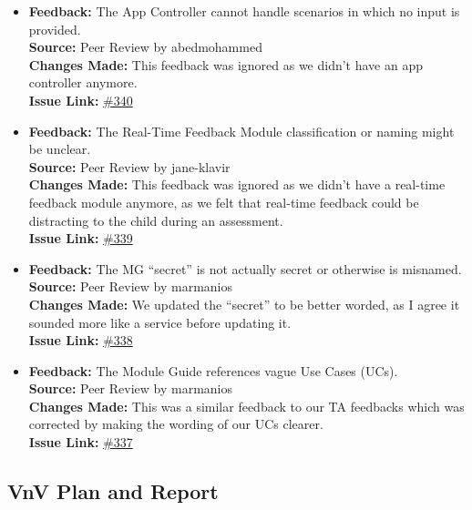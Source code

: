 \documentclass{article}
\begin{document}
\begin{itemize}
    \item 
        \textbf{Feedback:} The App Controller cannot handle scenarios in which no input is provided.\\
        \textbf{Source:} Peer Review by abedmohammed\\
        \textbf{Changes Made:} This feedback was ignored as we didn’t have an app controller anymore.\\
        \textbf{Issue Link:} \href{https://github.com/parishanizam/TeleHealth/issues/340}{\#340}
  
    \item 
        \textbf{Feedback:} The Real-Time Feedback Module classification or naming might be unclear.\\
        \textbf{Source:} Peer Review by jane-klavir\\
        \textbf{Changes Made:} This feedback was ignored as we didn’t have a real-time feedback module anymore, as we felt that real-time feedback could be distracting to the child during an assessment.\\
        \textbf{Issue Link:} \href{https://github.com/parishanizam/TeleHealth/issues/339}{\#339}
  
    \item 
        \textbf{Feedback:} The MG “secret” is not actually secret or otherwise is misnamed.\\
        \textbf{Source:} Peer Review by marmanios\\
        \textbf{Changes Made:} We updated the “secret” to be better worded, as I agree it sounded more like a service before updating it.\\
        \textbf{Issue Link:} \href{https://github.com/parishanizam/TeleHealth/issues/338}{\#338}
  
    \item 
        \textbf{Feedback:} The Module Guide references vague Use Cases (UCs).\\
        \textbf{Source:} Peer Review by marmanios\\
        \textbf{Changes Made:} This was a similar feedback to our TA feedbacks which was corrected by making the wording of our UCs clearer.\\
        \textbf{Issue Link:} \href{https://github.com/parishanizam/TeleHealth/issues/337}{\#337}

\end{itemize}

\subsection{VnV Plan and Report}
\end{document}
